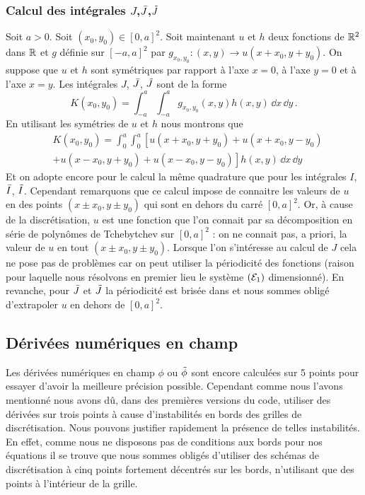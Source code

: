 \documentclass[10.5pt]{article}
\begin{document}
\begin{multicols}{2}
\subsubsection{Calcul des intégrales $J$,$\bar{J}$,$\tilde{J}$ }
\label{sec:IntJ}

Soit $a>0$. Soit $(x_0,y_0) \in [0,a]^2$. Soit maintenant $u$ et $h$ deux fonctions de $\mathbb{R}^2$ dans $\mathbb{R}$ et  $g$ définie sur $[-a, a]^2$  par $g_{x_0, y_0} : (x,y) \rightarrow u(x+x_0, y+y_0)$. On suppose que $u$ et $h$ sont symétriques par rapport à l'axe $x=0$, à l'axe $y=0$ et à l'axe $x=y$. Les intégrales $J$, $\bar{J}$, $\tilde{J}$ sont de la forme 
\begin{equation}
K(x_0,y_0) = \int_{-a}^{a} \int_{-a}^{a} g_{x_0, y_0}(x,y) h(x,y) \,  \dd x \, \dd y 	 \, .
\end{equation}
En utilisant les symétries de $u$ et $h$ nous montrons que
\begin{equation}
\begin{split}
& K(x_0,y_0) = \int_{0}^{a}  \int_{0}^{a}  \left[ u(x+x_0, y+y_0) + u(x+x_0, y-y_0) \right. \\
 & +  \left. u(x-x_0, y+y_0) + u(x-x_0, y-y_0)\right] h(x,y)  \, \dd x \, \dd y 
\end{split}
\end{equation}
Et on adopte encore pour le calcul la même quadrature que pour les intégrales $I$, $\bar{I}$, $\tilde{I}$. Cependant remarquons que ce calcul impose de connaitre les valeurs de $u$ en des points $(x \pm x_0, y \pm y_0)$ qui sont en dehors du carré $[0, a]^2$. Or, à cause de la discrétisation, $u$ est une fonction que l'on connait par sa décomposition en série de polynômes de Tchebytchev sur $[0,a]^2$ : on ne connait pas, a priori, la valeur de $u$ en tout $(x\pm x_0, y\pm y_0)$. Lorsque l'on s'intéresse au calcul de $J$ cela ne pose pas de problèmes car on peut utiliser la périodicité des fonctions (raison pour laquelle nous résolvons en premier lieu le système $(\mathcal{E}_1)$ dimensionné). En revanche, pour $\bar{J}$ et $\tilde{J}$ la périodicité est brisée dans et nous sommes obligé d'extrapoler $u$ en dehors de $[0,a]^2$. 





\subsection{Dérivées numériques en champ }

Les dérivées numériques en champ $\phi$ ou $\tilde{\phi}$ sont encore calculées sur 5 points pour essayer d'avoir la meilleure  précision possible. Cependant comme nous l'avons mentionné nous avons dû, dans des premières versions du code, utiliser des dérivées sur trois points à cause d'instabilités en bords des grilles de discrétisation. Nous pouvons justifier rapidement la présence de telles instabilités. En effet, comme nous ne disposons pas de conditions aux bords pour nos équations il se trouve que nous sommes obligés d'utiliser des schémas de discrétisation à cinq points fortement décentrés sur les bords, n'utilisant que des points à l'intérieur de la grille.\\



\end{multicols}
\end{document}
